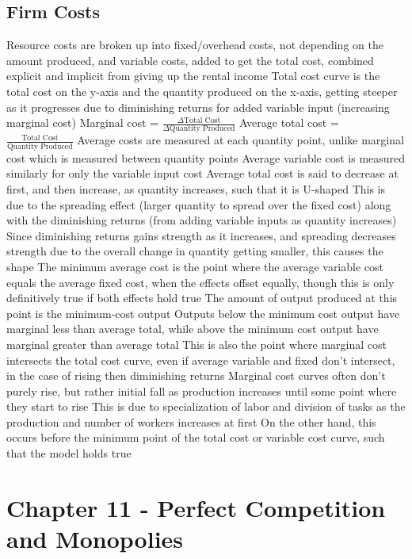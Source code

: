 \documentclass[11 pt, twoside]{article}
\newenvironment{outline*}
{
	\begin{outline}[enumerate]
	}
	{\end{outline}
}
\begin{document}
\subsection{Firm Costs}
\begin{outline*}
\1 Resource costs are broken up into fixed/overhead costs, not depending on the amount produced, and variable costs, added to get the total cost, combined explicit and implicit from giving up the rental income
\2 Total cost curve is the total cost on the y-axis and the quantity produced on the x-axis, getting steeper as it progresses due to diminishing returns for added variable input (increasing marginal cost)
\2 Marginal cost = $\frac{\Delta \text{Total Cost}}{\Delta \text{Quantity Produced}}$
\1 Average total cost = $\frac{\text{Total Cost}}{\text{Quantity Produced}}$
\2 Average costs are measured at each quantity point, unlike marginal cost which is measured between quantity points
\2 Average variable cost is measured similarly for only the variable input cost
\1 Average total cost is said to decrease at first, and then increase, as quantity increases, such that it is U-shaped
\2 This is due to the spreading effect (larger quantity to spread over the fixed cost) along with the diminishing returns (from adding variable inputs as quantity increases)
\3 Since diminishing returns gains strength as it increases, and spreading decreases strength due to the overall change in quantity getting smaller, this causes the shape
\2 The minimum average cost is the point where the average variable cost equals the average fixed cost, when the effects offset equally, though this is only definitively true if both effects hold true
\3 The amount of output produced at this point is the minimum-cost output
\3 Outputs below the minimum cost output have marginal less than average total, while above the minimum cost output have marginal greater than average total
\3 This is also the point where marginal cost intersects the total cost curve, even if average variable and fixed don't intersect, in the case of rising then diminishing returns
\1 Marginal cost curves often don't purely rise, but rather initial fall as production increases until some point where they start to rise
\2 This is due to specialization of labor and division of tasks as the production and number of workers increases at first
\2 On the other hand, this occurs before the minimum point of the total cost or variable cost curve, such that the model holds true
\end{outline*}
\section{Chapter 11 - Perfect Competition and Monopolies}
\end{document}
